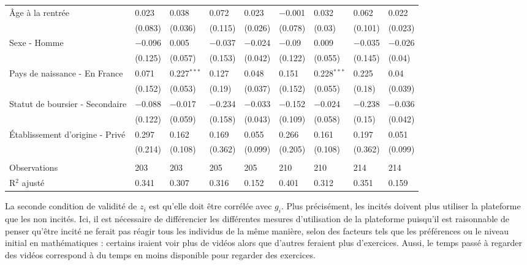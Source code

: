 \documentclass[
]{book}
\begin{document}
\begin{landscape}
\begin{ThreePartTable}
\begin{longtable}[t]{lllllllll}
Âge à la rentrée & 0.023 & 0.038 & 0.072 & 0.023 & $-$0.001 & 0.032 & 0.062 & 0.022\\
 & (0.083) & (0.036) & (0.115) & (0.026) & (0.078) & (0.03) & (0.101) & (0.023)\\
Sexe - Homme & $-$0.096 & 0.005 & $-$0.037 & $-$0.024 & $-$0.09 & 0.009 & $-$0.035 & $-$0.026\\
 & (0.125) & (0.057) & (0.153) & (0.042) & (0.122) & (0.055) & (0.145) & (0.04)\\
Pays de naissance - En France & 0.071 & 0.227$^{***}$ & 0.127 & 0.048 & 0.151 & 0.228$^{***}$ & 0.225 & 0.04\\
 & (0.152) & (0.053) & (0.19) & (0.037) & (0.152) & (0.055) & (0.18) & (0.039)\\
Statut de boursier - Secondaire & $-$0.088 & $-$0.017 & $-$0.234 & $-$0.033 & $-$0.152 & $-$0.024 & $-$0.238 & $-$0.036\\
 & (0.122) & (0.059) & (0.158) & (0.043) & (0.109) & (0.058) & (0.15) & (0.042)\\
Établissement d'origine - Privé & 0.297 & 0.162 & 0.169 & 0.055 & 0.266 & 0.161 & 0.197 & 0.051\\
 & (0.214) & (0.108) & (0.362) & (0.099) & (0.205) & (0.108) & (0.362) & (0.099)\\
 &  &  &  &  &  &  &  & \\
Observations & 203 & 203 & 205 & 205 & 210 & 210 & 214 & 214\\
R$^2$ ajusté & 0.341 & 0.307 & 0.316 & 0.152 & 0.401 & 0.312 & 0.351 & 0.159\\*
\end{longtable}
\end{ThreePartTable}
\endgroup{}
\end{landscape}

La seconde condition de validité de \(z_i\) est qu'elle doit être corrélée avec \(g_i\). Plus précisément, les incités doivent plus utiliser la plateforme que les non incités. Ici, il est nécessaire de différencier les différentes mesures d'utilisation de la plateforme puisqu'il est raisonnable de penser qu'être incité ne ferait pas réagir tous les individus de la même manière, selon des facteurs tels que les préférences ou le niveau initial en mathématiques : certains iraient voir plus de vidéos alors que d'autres feraient plus d'exercices. Aussi, le temps passé à regarder des vidéos correspond à du temps en moins disponible pour regarder des exercices.
\end{document}
